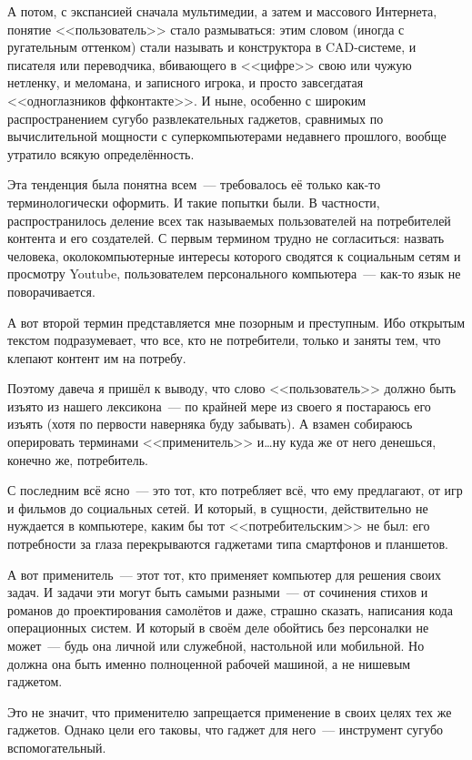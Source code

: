 А потом, с экспансией сначала мультимедии, а затем и массового Интернета, понятие <<пользователь>> стало размываться: этим словом (иногда с ругательным оттенком) стали называть и конструктора в CAD-системе, и писателя или переводчика, вбивающего в <<цифре>> свою или чужую нетленку, и меломана, и записного игрока, и просто завсегдатая <<одноглазников ффконтакте>>. И ныне, особенно с широким распространением сугубо развлекательных гаджетов, сравнимых по вычислительной мощности с суперкомпьютерами недавнего прошлого, вообще утратило всякую определённость.

Эта тенденция была понятна всем~--- требовалось её только как-то терминологически оформить. И такие попытки были. В частности, распространилось деление всех так называемых пользователей на потребителей контента и его создателей. С первым термином трудно не согласиться: назвать человека, околокомпьютерные интересы которого сводятся к социальным сетям и просмотру Youtube, пользователем персонального компьютера~--- как-то язык не поворачивается.

А вот второй термин представляется мне позорным и преступным. Ибо открытым текстом подразумевает, что все, кто не потребители, только и заняты тем, что клепают контент им на потребу.

Поэтому давеча я пришёл к выводу, что слово <<пользователь>> должно быть изъято из нашего лексикона~--- по крайней мере из своего я постараюсь его изъять (хотя по первости наверняка буду забывать). А взамен собираюсь оперировать терминами <<применитель>> и\dots ну куда же от него денешься, конечно же, потребитель.

С последним всё ясно~--- это тот, кто потребляет всё, что ему предлагают, от игр и фильмов до социальных сетей. И который, в сущности, действительно не нуждается в компьютере, каким бы тот <<потребительским>> не был: его потребности за глаза перекрываются гаджетами типа смартфонов и планшетов.

А вот применитель~--- этот тот, кто применяет компьютер для решения своих задач. И задачи эти могут быть самыми разными~--- от сочинения стихов и романов до проектирования самолётов и даже, страшно сказать, написания кода операционных систем. И который в своём деле обойтись без персоналки не может~--- будь она личной или служебной, настольной или мобильной. Но должна она быть именно полноценной рабочей машиной, а не нишевым гаджетом.

Это не значит, что применителю запрещается применение в своих целях тех же гаджетов. Однако цели его таковы, что гаджет для него~--- инструмент сугубо вспомогательный.

